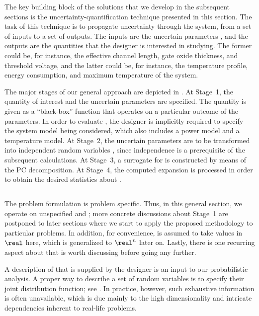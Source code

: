 The key building block of the solutions that we develop in the subsequent
sections is the uncertainty-quantification technique presented in this section.
The task of this technique is to propagate uncertainty through the system, from
a set of inputs to a set of outputs. The inputs are the uncertain parameters
\vu, and the outputs are the quantities that the designer is interested in
studying. The former could be, for instance, the effective channel length, gate
oxide thickness, and threshold voltage, and the latter could be, for instance,
the temperature profile, energy consumption, and maximum temperature of the
system.

The major stages of our general approach are depicted in .
At Stage~1, the quantity of interest \g and the uncertain parameters \vu are
specified. The quantity is given as a ``black-box'' function that operates on a
particular outcome of the parameters. In order to evaluate \g, the designer is
implicitly required to specify the system model being considered, which also
includes a power model and a temperature model. At Stage~2, the uncertain
parameters \vu are to be transformed into independent random variables \vz,
since independence is a prerequisite of the subsequent calculations. At Stage~3,
a surrogate for \g is constructed by means of the \ac{PC} decomposition. At
Stage~4, the computed expansion is processed in order to obtain the desired
statistics about \g.

\subsection{\problemtitle}

The problem formulation is problem specific. Thus, in this general section, we
operate on unspecified \g and \vu; more concrete discussions about Stage~1 are
postponed to later sections where we start to apply the proposed methodology to
particular problems. In addition, for convenience, \g is assumed to take values
in $\real$ here, which is generalized to $\real^n$ later on. Lastly, there is
one recurring aspect about \vu that is worth discussing before going any
further.

A description of \vu that is supplied by the designer is an input to our
probabilistic analysis. A proper way to describe a set of random variables is to
specify their joint distribution function; see . In
practice, however, such exhaustive information is often unavailable, which is
due mainly to the high dimensionality and intricate dependencies inherent to
real-life problems.


